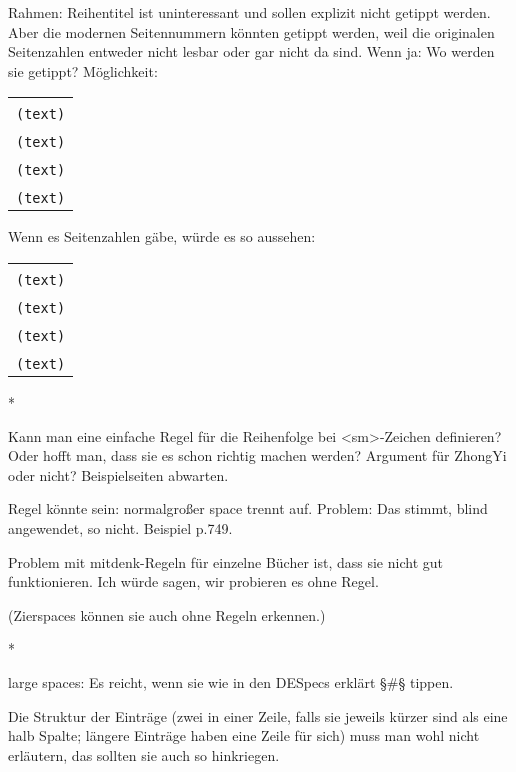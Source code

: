 \documentclass[fontsize=11pt, paper=a4, 
DIV15,
headings=normal,
parskip=half-, 
numbers=noenddot]{scrartcl}
\makeatletter
\newenvironment{typeChinese}{\begin{alltt}\s\begin{tabular}{@{}l}}{\end{tabular}\end{alltt}}
\newcommand{\chin}[1]{{\fontspec{Sun-ExtA}{#1}}}
\makeatother
\begin{document}
Rahmen: Reihentitel ist uninteressant und sollen explizit nicht getippt werden. Aber die modernen Seitennummern könnten getippt werden, weil die originalen Seitenzahlen entweder nicht lesbar oder gar nicht da sind. Wenn ja: Wo werden sie getippt? Möglichkeit:

\begin{typeChinese}
\bold{<pb a>} \bold{[}\chin{五五八}\bold{]} \\
(text) \\
\bold{<pb b>} \\
(text) \\
\bold{<pb a>} \\
(text) \\
\bold{<pb b>} \\
(text) \\
\end{typeChinese}

Wenn es Seitenzahlen gäbe, würde es so aussehen:

\begin{typeChinese}
\bold{<pb} \chin{三十七}\bold{a>} \bold{[}\chin{五五八}\bold{]} \\
(text) \\
\bold{<pb} \chin{三十七}\bold{b>} \\
(text) \\
\bold{<pb} \chin{三十八}\bold{a>} \\
(text) \\
\bold{<pb} \chin{三十八}\bold{b>} \\
(text) \\
\end{typeChinese}

*

Kann man eine einfache Regel für die Reihenfolge bei <sm>-Zeichen definieren? Oder hofft man, dass sie es schon richtig machen werden? Argument für ZhongYi oder nicht? Beispielseiten abwarten.

Regel könnte sein: normalgroßer space trennt auf. Problem: Das stimmt, blind angewendet, so nicht. Beispiel p.749.

Problem mit mitdenk-Regeln für einzelne Bücher ist, dass sie nicht gut funktionieren. Ich würde sagen, wir probieren es ohne Regel.

(Zierspaces können sie auch ohne Regeln erkennen.)

*

large spaces: Es reicht, wenn sie wie in den DESpecs erklärt §#§ tippen.

Die Struktur der Einträge (zwei in einer Zeile, falls sie jeweils kürzer sind als eine halb Spalte; längere Einträge haben eine Zeile für sich) muss man wohl nicht erläutern, das sollten sie auch so hinkriegen.
\end{document}
